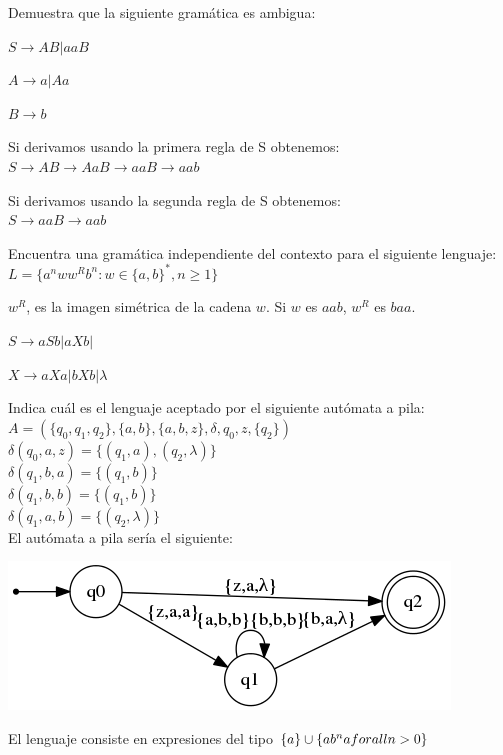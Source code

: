  \begin{problem}[4]
 Demuestra que la siguiente gramática es ambigua:
 
 $S \longrightarrow AB | aaB$
 
 $A \longrightarrow a|Aa$
 
 $B\longrightarrow b$
 
 
 \solution
 Si derivamos usando la primera regla de S obtenemos:\\
 $S \longrightarrow AB \longrightarrow AaB \longrightarrow aaB \longrightarrow aab $
 
  Si derivamos usando la segunda regla de S obtenemos:\\
  $S \longrightarrow aaB \longrightarrow aab$
 
 \end{problem}
  
  \begin{problem}[5]
  Encuentra una gramática independiente del contexto para el siguiente lenguaje:\\
  $L=\{a^nww^Rb^n:w\in\{a,b\}^*, n\geq1\}$
  
  \solution
  $w^R$, es la imagen simétrica de la cadena $w$. Si $w$ es $aab$, $w^R$ es $baa$.
  
   $S \longrightarrow aSb | aXb | $
   
   $X \longrightarrow aXa | bXb | \lambda$

  
  \end{problem}
  
  \begin{problem}[6]
  Indica cuál es el lenguaje aceptado por el siguiente autómata a pila:\\
  $A = (\{q_0,q_1,q_2\},\{a,b\},\{a,b,z\},\delta,q_0,z,\{q_2\})$\\
  $\delta(q_0,a,z) = \{(q_1,a),(q_2,\lambda)\} $\\
   $\delta(q_1,b,a) = \{(q_1,b)\} $\\
   $\delta(q_1,b,b) = \{(q_1,b)\} $\\
   $\delta(q_1,a,b) = \{(q_2,\lambda)\} $\\
  
  \solution
  El autómata a pila sería el siguiente:
  \begin{center}
    \includegraphics[scale=0.75]{tex/ejerciciosHoja1/automata_8.png}
   \end{center}
   El lenguaje consiste en expresiones del tipo $\{a\}\cup\{ab^n a\\forall n>0\}$
  
  \end{problem}
  
  
  
 
 
 
 
 
 
 

